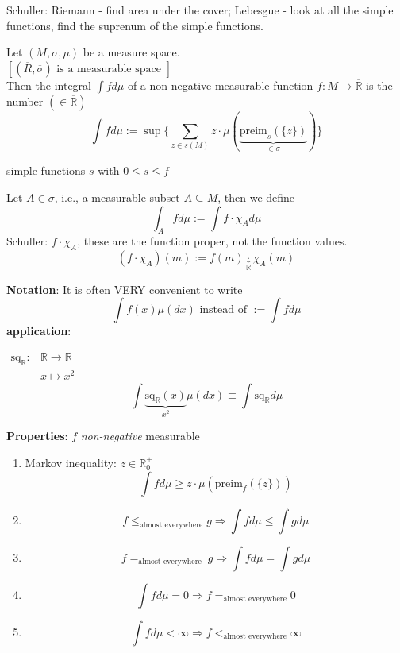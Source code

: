Schuller: Riemann - find area under the cover; Lebesgue - look at all the simple functions, find the suprenum of the simple functions.

\begin{definition}
	Let $(M, \sigma, \mu)$ be a measure space. \\
	$[(\overline{R}, \overline{\sigma}) \text{ is a measurable space }]$ \\
	Then the integral $\int f d\mu$ of a non-negative measurable function $f: M \to \overline{\mathbb{R}}$ is the number $(\in \overline{\mathbb{R}})$
\[
\int f d\mu := \sup{ \lbrace \sum_{z \in s(M)} z \cdot \mu\left( \underbrace{ \text{preim}_s(\lbrace z \rbrace) }_{\in \sigma} \right) \rbrace }
\]

simple functions $s$ with $0\leq s \leq f$

\end{definition}

\begin{definition}
	Let $A \in \sigma$, i.e., a measurable subset $A \subseteq M$, then we define
	\[
	\int_A f d\mu := \int f \cdot \chi_A d\mu
	\]
	Schuller: $f\cdot \chi_A$, these are the function proper, not the function values.
	\[
	(f\cdot \chi_A)(m) := f(m) \underbrace{\cdot}_{\mathbb{R}} \chi_A(m)
	\]

\textbf{Notation}: It is often VERY convenient to write 
\[
\int f(x) \mu(dx) \text{ instead of } := \int f d\mu
\]
\textbf{application}: 

$\begin{aligned}
	\text{sq}_{\mathbb{R}} : & \mathbb{R} \to \mathbb{R} \\
	& x \mapsto x^2 
\end{aligned}$
\[
\int \underbrace{ \text{sq}_{\mathbb{R}}(x) }_{x^2} \mu(dx) \equiv   \int \text{sq}_{\mathbb{R}} d\mu
\]

\textbf{Properties}: $f$ \emph{non-negative} measurable
\begin{enumerate}
	\item[(i)] Markov inequality: $z \in \mathbb{R}^+_0$
	\[
	\int f d\mu \geq z \cdot \mu(\text{preim}_f(\lbrace z \rbrace))
	\]
	\item[(ii)] 
	\[
	f \leq_{\text{almost everywhere}} g \Longrightarrow \int f d\mu \leq \int g d\mu
	\]
	\item[(iii)] 
	\[
	f =_{\text{almost everywhere }} g \Longrightarrow \int f d\mu = \int g d\mu
	\]
	\item[(iv)] 
	\[
	\int f d\mu = 0 \Longrightarrow f =_{\text{almost everywhere} } 0 
	\]
	\item[(v)]
	\[
	\int f d\mu < \infty \Longrightarrow f <_{\text{almost everywhere}} \infty
	\]
\end{enumerate}

\end{definition}

